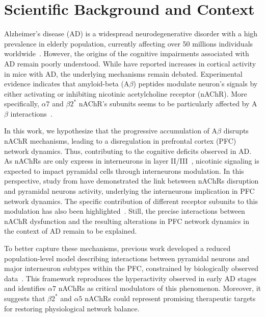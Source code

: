 \documentclass[10pt,letterpaper]{article}
\begin{document}
\section{Scientific Background and Context}
{
Alzheimer's disease (AD) is a widespread neurodegenerative disorder with a high prevalence in elderly population, currently affecting over 50 millions individuals worldwide~\citep{Breijyeh2020}. However, the origins of the cognitive impairments associated with AD remain poorly understood. While \citet{Palop2007} have reported increases in cortical activity in mice with AD, the underlying %
mechanisms remain debated. Experimental evidence indicates that amyloid-beta (A$\beta$) peptides modulate neuron's signals by either activating or inhibiting nicotinic acetylcholine receptor (nAChR). More specifically, $\alpha7$ and $\beta2^*$ nAChR's subunits seems to be particularly affected by A$\beta$ interactions~\citep{Lombardo2015,Parri2011}.

In this work, we hypothesize that the progressive accumulation of A$\beta$ disrupts nAChR mechanisms, leading to a disregulation in prefrontal cortex (PFC) network dynamics. Thus, contributing to the cognitive deficits observed in AD. As nAChRs are only express in interneurons in layer II/III~\citep{Poorthuis2013}, nicotinic signaling is expected to impact pyramidal cells through interneurons modulation. In this perspective, study from \citet{Koukouli2017} have demonstrated the link betsween nAChRs disruption and pyramidal neurons activity, underlying the interneurons implication in PFC network dynamics. The specific contribution of different receptor subunits to this modulation has also been highlighted~\citep{Maskos2014}. Still, the precise interactions between nAChR dysfunction and the resulting alterations in PFC network dynamics in the context of AD remain to be explained.

To better capture these mechanisms, previous work developed a reduced population-level model describing interactions between pyramidal neurons and major interneuron subtypes within the PFC, constrained by biologically observed data~\citep{Koukouli2025}. This framework reproduces the hyperactivity observed in early AD stages and identifies $\alpha7$ nAChRs as critical modulators of this phenomenon. Moreover, it suggests that $\beta2^*$ and $\alpha5$ nAChRs could represent promising therapeutic targets for restoring physiological network balance.

}
\end{document}
